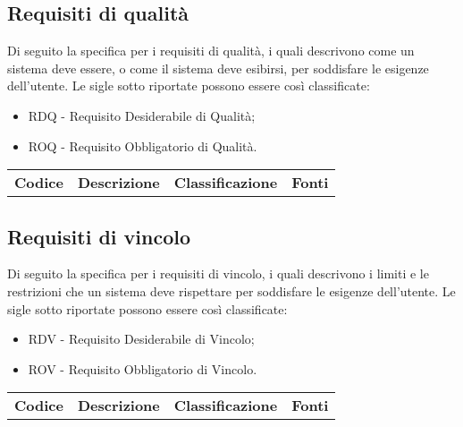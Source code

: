 \documentclass[10pt, a4paper]{article}
\begin{document}
\subsection{Requisiti di qualità}
Di seguito la specifica per i requisiti di qualità, i quali descrivono come un sistema deve essere, o
come il sistema deve esibirsi, per soddisfare le esigenze dell'utente.
Le sigle sotto riportate possono essere così classificate:
\begin{itemize}
    \item RDQ - Requisito Desiderabile di Qualità;
    \item ROQ - Requisito Obbligatorio di Qualità.
\end{itemize}
\renewcommand{\arraystretch}{1.5}
\begin{tabularx}{\textwidth}{|c|X|c|c|}\hline
\textbf{Codice} & \textbf{Descrizione} & \textbf{Classificazione} & \textbf{Fonti} \\
\end{tabularx}

\subsection{Requisiti di vincolo}
Di seguito la specifica per i requisiti di vincolo, i quali descrivono i limiti e le restrizioni che un sistema
deve rispettare per soddisfare le esigenze dell'utente.
Le sigle sotto riportate possono essere così classificate:
\begin{itemize}
    \item RDV - Requisito Desiderabile di Vincolo;
    \item ROV - Requisito Obbligatorio di Vincolo.
\end{itemize}
\renewcommand{\arraystretch}{1.5}
\begin{tabularx}{\textwidth}{|c|X|c|c|}\hline
\textbf{Codice} & \textbf{Descrizione} & \textbf{Classificazione} & \textbf{Fonti} \\
\end{tabularx}
\end{document}

